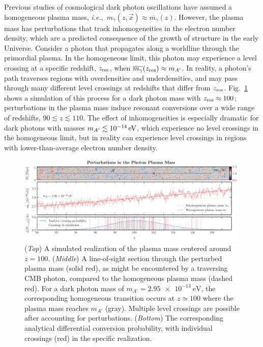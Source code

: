 \documentclass[prd,aps,10pt,nofootinbib,twocolumn,superscriptaddress,preprintnumbers,balancelastpage,longbibliography]{revtex4-1}
\begin{document}
Previous studies of cosmological dark photon oscillations have assumed a homogeneous plasma mass, \emph{i.e.},\ $m_\gamma(z, \vec x) \approx \overline {m_\gamma}(z)$.  However, the plasma mass has perturbations that track inhomogeneities in the electron number density, which are a predicted consequence of the growth of structure in the early Universe.  Consider a photon that propagates along a worldline through the primordial plasma.  In the homogeneous limit, this photon may experience a level crossing at a specific redshift, $z_{\rm res}$, when $\overline {m_\gamma}(z_{\rm res}) \approx m_{A^\prime}$.   In reality, a photon's path traverses regions with overdensities and underdensities, and may pass through many different level crossings at redshifts that differ from $z_{\rm res}$. Fig.~\ref{fig:simulations} shows a simulation of this process for a dark photon mass with $z_{\rm res} \approx 100$; perturbations in the plasma mass induce resonant conversions over a wide range of redshifts, $90 \lesssim z \lesssim 110$.  The effect of inhomogeneities is especially dramatic for dark photons with masses $\mAp \lesssim \SI{e-14}{\eV}$, which experience no level crossings in the homogeneous limit, but in reality can experience level crossings in regions with lower-than-average electron number density.

%
\begin{figure}[htbp]
    \centering
    \includegraphics[width=0.99\textwidth]{plots/perturbations.pdf}
    \caption{
    ({\it Top}) A simulated realization of the plasma mass centered around $z=100$.  ({\it Middle}) A line-of-sight section through the perturbed plasma mass (solid red), as might be encountered by a traversing CMB photon, compared to the homogeneous plasma mass (dashed red). For a dark photon mass of $m_{A'} = \SI{2.95e-13}{\eV}$, the corresponding homogeneous transition occurs at $z\simeq 100$ where the plasma mass reaches $m_{A'}$ (gray). Multiple level crossings 
    are possible after accounting for perturbations. ({\it Bottom}) The corresponding analytical differential conversion probability, with individual crossings (red) in the specific realization. 
    }
    \label{fig:simulations}
\end{figure}
%
\end{document}
